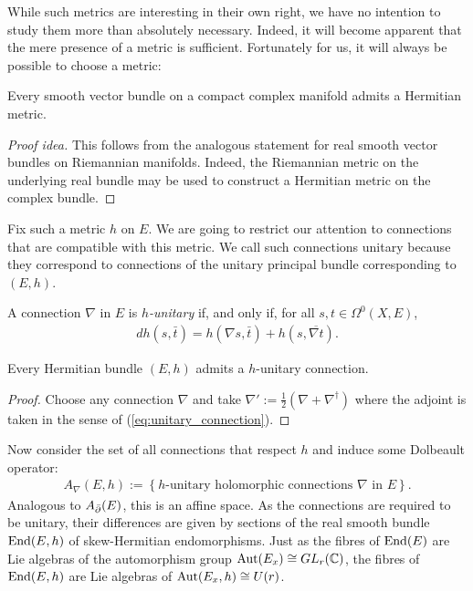 \documentclass[12pt]{ociamthesis}  %
\begin{document}
While such metrics are interesting in their own right, we have no
intention to study them more than absolutely necessary. Indeed, it will
become apparent that the mere presence of a metric is sufficient.
Fortunately for us, it will always be possible to choose a metric:

\begin{lemma}\label{thm:hermitian_structures_exist}
  Every smooth vector bundle on a compact complex manifold admits a
  Hermitian metric.
  \begin{proof}[Proof idea]
    This follows from the analogous statement for real smooth vector
    bundles on Riemannian manifolds. Indeed, the Riemannian metric on
    the underlying real bundle may be used to construct a Hermitian
    metric on the complex bundle.
  \end{proof}
\end{lemma}

Fix such a metric $h$ on $E$. We are going to restrict our attention to
connections that are compatible with this metric. We call such
connections unitary because they correspond to connections
of the unitary principal bundle corresponding to $(E,h)$.

\begin{definition}
  A connection $\nabla$ in $E$ is \emph{$h$-unitary}
  if, and only if, for all $s,t\in\Omega^0(X,E)$,
  \begin{align}\label{eq:unitary_connection}
    dh(s,\bar t) = h(\nabla s,\bar t) + h(s,\overline{\nabla t}).
  \end{align}
\end{definition}

\begin{lemma}
  Every Hermitian bundle $(E,h)$ admits a $h$-unitary connection.
  \begin{proof}
    Choose any connection $\nabla$ and take
    $\nabla' := \frac{1}{2}(\nabla + \nabla^\dagger)$
    where the adjoint is taken in the sense of
    (\ref{eq:unitary_connection}).
  \end{proof}
\end{lemma}

Now consider the set of all connections that respect $h$ and induce
some Dolbeault operator:
\begin{align*}
  A_\nabla(E,h) := \left\lbrace{\text{$h$-unitary holomorphic connections $\nabla$ in $E$}}\right\rbrace.
\end{align*}
Analogous to $A_{\bar{\partial}} (E)$, this is an affine space.
As the connections are required to be unitary, their differences
are given by sections of the real smooth bundle $\operatorname{End}(E,h)$ of
skew-Hermitian endomorphisms. Just as the fibres of $\operatorname{End}(E)$
are Lie algebras of the automorphism group $\operatorname{Aut}(E_x)\cong GL_r(\mathbb C)$,
the fibres of $\operatorname{End}(E,h)$ are Lie algebras of $\operatorname{Aut}(E_x,h)\cong U(r)$.
\end{document}
